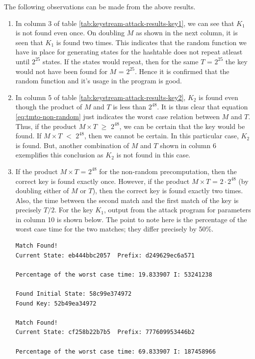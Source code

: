 The following observations can be made from the above results. 
\begin{enumerate}
\item In column 3 of table \ref{tab:keystream-attack-results-key1}, we can see that $K_1$ is not found even once. On doubling $M$ as shown in the next column, it is seen that $K_1$ is found two times. This indicates that the random function we have in place for generating states for the hashtable does not repeat atleast until $2^{25}$ states. If the states would repeat, then for the same $T$ = $2^{25}$ the key would not have been found for $M$ = $2^{25}$. Hence it is confirmed that the random function and it's usage in the program is good.

\item In column 5 of table \ref{tab:keystream-attack-results-key2}, $K_2$ is found even though the product of $M$ and $T$ is less than $2^{48}$. It is thus clear that equation \ref{eq:tmto-non-random} just indicates the worst case relation between $M$ and $T$. Thus, if the product $M \times T$ $\geq$ $2^{48}$, we can be certain that the key would be found. If $M \times T$ $<$ $2^{48}$, then we cannot be certain. In this particular case, $K_2$ is found. But, another combination of $M$ and $T$ shown in column 6 exemplifies this conclusion as $K_2$ is not found in this case.

\item If the product $M \times T$ = $2^{48}$ for the non-random precomputation, then the correct key is found exactly once. However, if the product $M \times T$ = $2 \cdot 2^{48}$ (by doubling either of $M$ or $T$), then the correct key is found exactly two times. Also, the time between the second match and the first match of the key is precisely $T/2$. For the key $K_1$, output from the attack program for parameters in column 10 is shown below. The point to note here is the percentage of the worst case time for the two matches; they differ precisely by 50\%. 

\begin{lstlisting}[frame=tb]
Match Found! 
Current State: eb444bbc2057  Prefix: d249629ec6a571

Percentage of the worst case time: 19.833907 I: 53241238

Found Initial State: 58c99e374972
Found Key: 52b49ea34972

Match Found! 
Current State: cf258b22b7b5  Prefix: 777609953446b2

Percentage of the worst case time: 69.833907 I: 187458966


\end{lstlisting}
\end{enumerate}
